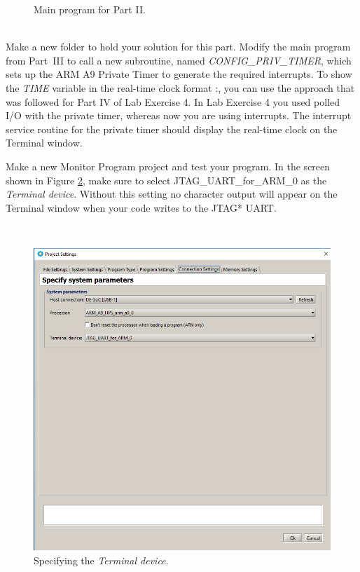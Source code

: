 \documentclass[epsfig,10pt,fullpage]{article}
\begin{document}
\begin{figure}[H]
\begin{center}
\begin{minipage}[t]{16.5 cm}

\end{minipage}
\end{center}
\caption{Main program for Part II.}
\label{fig:code2}
\end{figure}

~\\
\noindent
Make a new folder to hold your solution for this part. Modify the main
program from Part~III to call a new subroutine, named {\it CONFIG\_PRIV\_TIMER}, which sets up the
ARM A9 Private Timer to generate the required interrupts. To show the {\it TIME} variable in
the real-time clock format :, you can use the approach that was
followed for Part IV of Lab Exercise 4. In Lab Exercise 4 you used polled I/O with
the private timer, whereas now you are using interrupts. The interrupt service routine for
the private timer should display the real-time clock on the Terminal window.

\noindent
Make a new Monitor Program project and test your program. In the screen shown in Figure
\ref{fig:terminal}, make sure to select {\sf JTAG\_UART\_for\_ARM\_0} as the {\it Terminal
device}. Without this setting no character output will appear on the Terminal window when 
your code writes to the JTAG* UART.

~\\
\begin{figure}[htb]
	\begin{center}
	\includegraphics[scale=0.58]{figures/terminal.png}
	\end{center}
	\vspace{-0.25cm}\caption{Specifying the {\it Terminal device}.}
\label{fig:terminal}
\end{figure}
\end{document}
